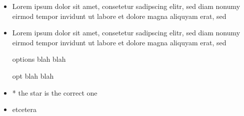 \documentclass{article}
\begin{document}
\begin{itemize}
  \item Lorem ipsum dolor sit amet, consetetur sadipscing elitr, sed diam
    nonumy eirmod tempor invidunt ut labore et dolore magna aliquyam erat, sed
  \item Lorem ipsum dolor sit amet, consetetur sadipscing elitr, sed diam
    nonumy eirmod tempor invidunt ut labore et dolore magna aliquyam erat, sed
\end{itemize}

\begin{itemize}
  something here

  \item [options] blah blah
  \item[opt] blah blah
  \item * the star is the correct one
  \item etcetera
\end{itemize}
\end{document}
